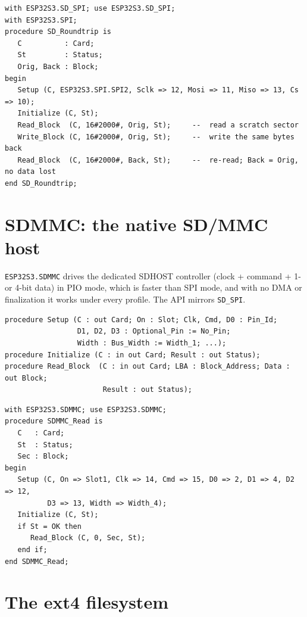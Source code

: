 \begin{lstlisting}
with ESP32S3.SD_SPI; use ESP32S3.SD_SPI;
with ESP32S3.SPI;
procedure SD_Roundtrip is
   C          : Card;
   St         : Status;
   Orig, Back : Block;
begin
   Setup (C, ESP32S3.SPI.SPI2, Sclk => 12, Mosi => 11, Miso => 13, Cs => 10);
   Initialize (C, St);
   Read_Block  (C, 16#2000#, Orig, St);     --  read a scratch sector
   Write_Block (C, 16#2000#, Orig, St);     --  write the same bytes back
   Read_Block  (C, 16#2000#, Back, St);     --  re-read; Back = Orig, no data lost
end SD_Roundtrip;
\end{lstlisting}

\section{SDMMC: the native SD/MMC host}

\texttt{ESP32S3.SDMMC} drives the dedicated SDHOST controller (clock + command +
1- or 4-bit data) in PIO mode, which is faster than SPI mode, and with no DMA or
finalization it works under every profile. The API mirrors \texttt{SD\_SPI}.

\begin{lstlisting}
procedure Setup (C : out Card; On : Slot; Clk, Cmd, D0 : Pin_Id;
                 D1, D2, D3 : Optional_Pin := No_Pin;
                 Width : Bus_Width := Width_1; ...);
procedure Initialize (C : in out Card; Result : out Status);
procedure Read_Block  (C : in out Card; LBA : Block_Address; Data : out Block;
                       Result : out Status);
\end{lstlisting}

\begin{lstlisting}
with ESP32S3.SDMMC; use ESP32S3.SDMMC;
procedure SDMMC_Read is
   C   : Card;
   St  : Status;
   Sec : Block;
begin
   Setup (C, On => Slot1, Clk => 14, Cmd => 15, D0 => 2, D1 => 4, D2 => 12,
          D3 => 13, Width => Width_4);
   Initialize (C, St);
   if St = OK then
      Read_Block (C, 0, Sec, St);
   end if;
end SDMMC_Read;
\end{lstlisting}

\section{The ext4 filesystem}

